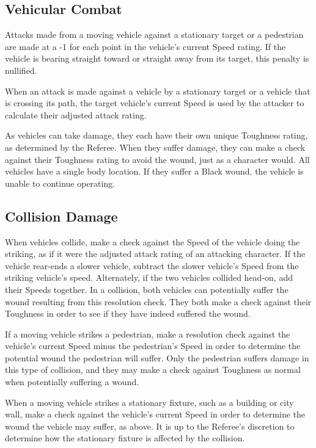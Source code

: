 \documentclass[oneside]{book}
\begin{document}
\begin{multicols}{2}
\subsection{Vehicular Combat}
Attacks made from a moving vehicle against a stationary target or a pedestrian are made at a -1 for each point in the vehicle's current Speed rating. If the vehicle is bearing straight toward or straight away from its target, this penalty is nullified. 

When an attack is made against a vehicle by a stationary target or a vehicle that is crossing its path, the target vehicle's current Speed is used by the attacker to calculate their adjusted attack rating. 

As vehicles can take damage, they each have their own unique Toughness rating, as determined by the Referee. When they suffer damage, they can make a check against their Toughness rating to avoid the wound, just as a character would. All vehicles have a single body location. If they suffer a Black wound, the vehicle is unable to continue operating. 

\subsection{Collision Damage}

When vehicles collide, make a check against the Speed of the vehicle doing the striking, as if it were the adjusted attack rating of an attacking character. If the vehicle rear-ends a slower vehicle, subtract the slower vehicle's Speed from the striking vehicle's speed. Alternately, if the two vehicles collided head-on, add their Speeds together. In a collision, both vehicles can potentially suffer the wound resulting from this resolution check. They both make a check against their Toughness in order to see if they have indeed suffered the wound. 

If a moving vehicle strikes a pedestrian, make a resolution check against the vehicle's current Speed minus the pedestrian's Speed in order to determine the potential wound the pedestrian will suffer. Only the pedestrian suffers damage in this type of collision, and they may make a check against Toughness as normal when potentially suffering a wound. 

When a moving vehicle strikes a stationary fixture, such as a building or city wall, make a check against the vehicle's current Speed in order to determine the wound the vehicle may suffer, as above. It is up to the Referee's discretion to determine how the stationary fixture is affected by the collision. 


\end{multicols}
\end{document}
